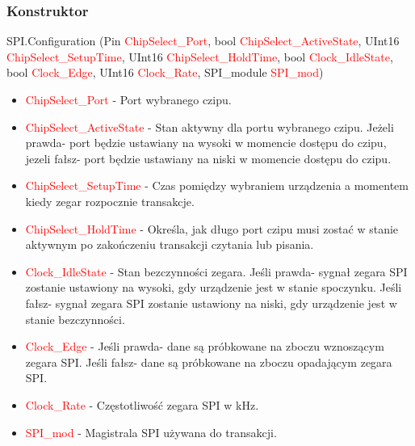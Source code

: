 \documentclass{article}
\begin{document}
\subsubsection{Konstruktor}
SPI.Configuration (Pin \textcolor{red}{ChipSelect\_Port}, bool \textcolor{red}{ChipSelect\_ActiveState}, \newline UInt16 \textcolor{red}{ChipSelect\_SetupTime}, UInt16 \textcolor{red}{ChipSelect\_HoldTime},  bool \textcolor{red}{Clock\_IdleState}, bool \textcolor{red}{Clock\_Edge}, UInt16 \textcolor{red}{Clock\_Rate}, SPI\_module \textcolor{red}{SPI\_mod})
\begin{itemize}
\item \textcolor{red}{ChipSelect\_Port} - Port wybranego czipu.
\item \textcolor{red}{ChipSelect\_ActiveState} - Stan aktywny dla portu wybranego czipu. Jeżeli prawda- port będzie ustawiany na wysoki w momencie dostępu do czipu, jezeli fałsz- port będzie ustawiany na niski w momencie dostępu do czipu.
\item \textcolor{red}{ChipSelect\_SetupTime} - Czas pomiędzy wybraniem urządzenia a momentem kiedy zegar rozpocznie transakcje. 
\item \textcolor{red}{ChipSelect\_HoldTime} - Określa, jak długo port czipu musi zostać w stanie aktywnym po zakończeniu transakcji czytania lub pisania.
\item \textcolor{red}{Clock\_IdleState} - Stan bezczynności zegara. Jeśli prawda- sygnał zegara SPI zostanie ustawiony na wysoki, gdy urządzenie jest w stanie spoczynku. Jeśli fałsz- sygnał zegara SPI zostanie ustawiony na niski, gdy urządzenie jest w stanie bezczynności. 
\item \textcolor{red}{Clock\_Edge} - Jeśli prawda- dane są próbkowane na zboczu wznoszącym zegara SPI. Jeśli fałsz- dane są próbkowane na zboczu opadającym zegara SPI.
\item \textcolor{red}{Clock\_Rate} - Częstotliwość zegara SPI w kHz.
\item \textcolor{red}{SPI\_mod} - Magistrala SPI używana do transakcji.
\end{itemize}
\newpage
\end{document}
